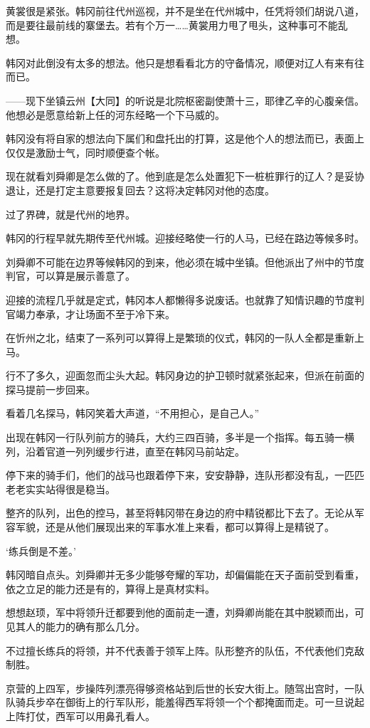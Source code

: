 黄裳很是紧张。韩冈前往代州巡视，并不是坐在代州城中，任凭将领们胡说八道，而是要往最前线的寨堡去。若有个万一……黄裳用力甩了甩头，这种事可不能乱想。

韩冈对此倒没有太多的想法。他只是想看看北方的守备情况，顺便对辽人有来有往而已。

——现下坐镇云州【大同】的听说是北院枢密副使萧十三，耶律乙辛的心腹亲信。他想必是愿意给新上任的河东经略一个下马威的。

韩冈没有将自家的想法向下属们和盘托出的打算，这是他个人的想法而已，表面上仅仅是激励士气，同时顺便查个帐。

现在就看刘舜卿是怎么做的了。他到底是怎么处置犯下一桩桩罪行的辽人？是妥协退让，还是打定主意要报复回去？这将决定韩冈对他的态度。

过了界碑，就是代州的地界。

韩冈的行程早就先期传至代州城。迎接经略使一行的人马，已经在路边等候多时。

刘舜卿不可能在边界等候韩冈的到来，他必须在城中坐镇。但他派出了州中的节度判官，可以算是展示善意了。

迎接的流程几乎就是定式，韩冈本人都懒得多说废话。也就靠了知情识趣的节度判官竭力奉承，才让场面不至于冷下来。

在忻州之北，结束了一系列可以算得上是繁琐的仪式，韩冈的一队人全都是重新上马。

行不了多久，迎面忽而尘头大起。韩冈身边的护卫顿时就紧张起来，但派在前面的探马提前一步回来。

看着几名探马，韩冈笑着大声道，“不用担心，是自己人。”

出现在韩冈一行队列前方的骑兵，大约三四百骑，多半是一个指挥。每五骑一横列，沿着官道一列列缓步行进，直至在韩冈马前站定。

停下来的骑手们，他们的战马也跟着停下来，安安静静，连队形都没有乱，一匹匹老老实实站得很是稳当。

整齐的队列，出色的控马，甚至将韩冈带在身边的府中精锐都比下去了。无论从军容军貌，还是从他们展现出来的军事水准上来看，都可以算得上是精锐了。

‘练兵倒是不差。’

韩冈暗自点头。刘舜卿并无多少能够夸耀的军功，却偏偏能在天子面前受到看重，依之立足的能力还是有的，算得上是真材实料。

想想赵顼，军中将领升迁都要到他的面前走一遭，刘舜卿尚能在其中脱颖而出，可见其人的能力的确有那么几分。

不过擅长练兵的将领，并不代表善于领军上阵。队形整齐的队伍，不代表他们克敌制胜。

京营的上四军，步操阵列漂亮得够资格站到后世的长安大街上。随驾出宫时，一队队骑兵步卒在御街上的行军队形，能羞得西军将领一个个都掩面而走。可一旦说起上阵打仗，西军可以用鼻孔看人。

